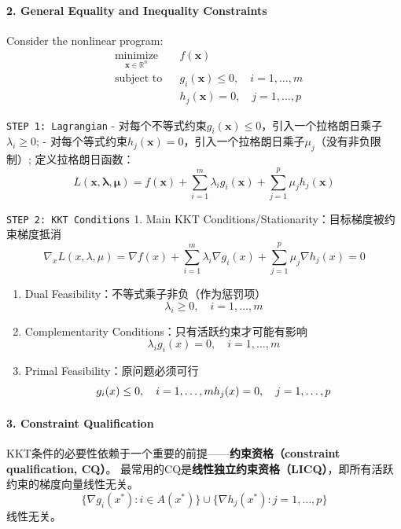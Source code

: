 \documentclass[11pt,a4paper]{article}
\begin{document}
\paragraph{2. General Equality and Inequality Constraints}\label{general-equality-and-inequality-constraints}

Consider the nonlinear program: \[\begin{aligned}
& \underset{\boldsymbol{x} \in \mathbb{R}^n}{\text{minimize}} & & f(\boldsymbol{x}) \\
& \text{subject to} & & g_i(\boldsymbol{x}) \leq 0, \quad i = 1, \ldots, m \\
& & & h_j(\boldsymbol{x}) = 0, \quad j = 1, \ldots, p
\end{aligned}\]

\texttt{STEP\ 1:\ Lagrangian} - 对每个不等式约束\(g_i(\boldsymbol{x}) \leq 0\)，引入一个拉格朗日乘子\(\lambda_i \geq 0\); - 对每个等式约束\(h_j(\boldsymbol{x}) = 0\)，引入一个拉格朗日乘子\(\mu_j\)（没有非负限制）; 定义拉格朗日函数： \[L(\boldsymbol{x}, \boldsymbol{\lambda}, \boldsymbol{\mu}) = f(\boldsymbol{x}) + \sum_{i=1}^m \lambda_i g_i(\boldsymbol{x}) + \sum_{j=1}^p \mu_j h_j(\boldsymbol{x})\]

\texttt{STEP\ 2:\ KKT\ Conditions} 1. Main KKT Conditions/Stationarity：目标梯度被约束梯度抵消 \[\nabla_x L(x,\lambda,\mu) = \nabla f(x) + \sum_{i=1}^m \lambda_i \nabla g_i(x) + \sum_{j=1}^p \mu_j \nabla h_j(x) = 0\]

\begin{enumerate}
\def\labelenumi{\arabic{enumi}.}
\setcounter{enumi}{1}
\item
  Dual Feasibility：不等式乘子非负（作为惩罚项） \[\lambda_i \geq 0, \quad i = 1, \ldots, m\]
\item
  Complementarity Conditions：只有活跃约束才可能有影响 \[\lambda_i g_i(x) = 0, \quad i = 1, \ldots, m\]
\item
  Primal Feasibility：原问题必须可行 \[g_i(x) \leq 0, \quad i = 1, \ldots, m\\
  h_j(x) = 0, \quad j = 1, \ldots, p\]
\end{enumerate}

\paragraph{3. Constraint Qualification}\label{constraint-qualification}

KKT条件的必要性依赖于一个重要的前提------\textbf{约束资格（constraint qualification, CQ）}。 最常用的CQ是\textbf{线性独立约束资格（LICQ）}，即所有活跃约束的梯度向量线性无关。 \[\{\nabla g_i(x^*) : i \in A(x^*)\} \cup \{\nabla h_j(x^*) : j = 1, \ldots, p\}\] 线性无关。
\end{document}

